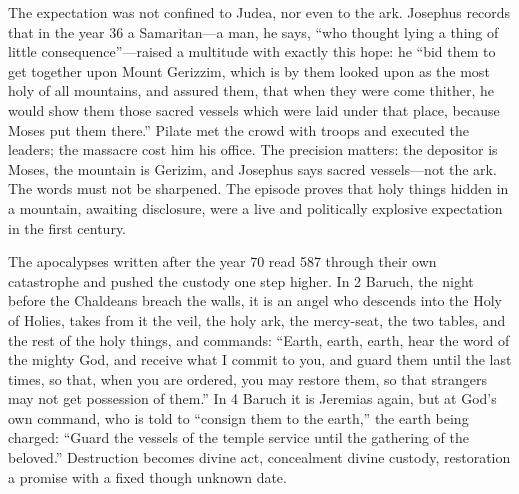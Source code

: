 The expectation was not confined to Judea, nor even to the ark. Josephus
records that in the year 36 a Samaritan---a man, he says, ``who thought
lying a thing of little consequence''---raised a multitude with exactly
this hope: he ``bid them to get together upon Mount
Gerizzim, which is by them looked upon as the most holy of all mountains,
and assured them, that when they were come thither, he would show them
those sacred vessels which were laid under that place, because Moses put
them there.'' Pilate met the crowd with troops and executed the leaders;
the massacre cost him his office. The precision matters: the depositor is
Moses, the mountain is Gerizim, and Josephus says sacred vessels---not the
ark. The words must not be sharpened. The episode proves that holy things
hidden in a mountain, awaiting disclosure, were a live and politically
explosive expectation in the first century.

The apocalypses written after the year 70 read 587 through their own
catastrophe and pushed the custody one step higher. In 2 Baruch, the night
before the Chaldeans breach the walls, it is an angel who descends into the
Holy of Holies, takes from it the veil, the holy ark, the mercy-seat, the
two tables, and the rest of the holy things, and commands:
``Earth, earth, earth, hear the word of the mighty God, and receive what I
commit to you, and guard them until the last times, so that, when you are
ordered, you may restore them, so that strangers may not get possession of
them.'' In 4 Baruch it is Jeremias again, but at God's own
command, who is told to ``consign them to the earth,'' the earth being
charged: ``Guard the vessels of the temple service until the gathering of
the beloved.''
Destruction becomes divine act, concealment divine custody, restoration a
promise with a fixed though unknown date.

